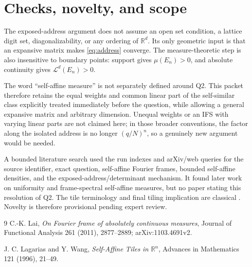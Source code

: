 \documentclass[11pt]{article}
\newcommand{\R}{\mathbb R}
\newcommand{\Leb}{\mathcal L^d}
\begin{document}
\section*{Checks, novelty, and scope}

The exposed-address argument does not assume an open set condition, a lattice
digit set, diagonalizability, or any ordering of $\R^d$.  Its only geometric
input is that an expansive matrix makes \eqref{eq:address} converge.  The
measure-theoretic step is also insensitive to boundary points: support gives
$\mu(E_n)>0$, and absolute continuity gives $\Leb(E_n)>0$.

The word ``self-affine measure'' is not separately defined around Q2.  This
packet therefore retains the equal weights and common linear part of the
self-similar class explicitly treated immediately before the question, while
allowing a general expansive matrix and arbitrary dimension.  Unequal
weights or an IFS with varying linear parts are not claimed here; in those
broader conventions, the factor along the isolated address is no longer
$(q/N)^n$, so a genuinely new argument would be needed.

A bounded literature search used the run indexes and arXiv/web queries for
the source identifier, exact question, self-affine Fourier frames, bounded
self-affine densities, and the exposed-address/determinant mechanism.  It
found later work on uniformity and frame-spectral self-affine measures, but
no paper stating this resolution of Q2.  The tile terminology and final
tiling implication are classical \cite{LW}.  Novelty is therefore
provisional pending expert review.

\begin{thebibliography}{9}
C.-K. Lai,
\emph{On Fourier frame of absolutely continuous measures},
Journal of Functional Analysis 261 (2011), 2877--2889;
arXiv:1103.4691v2.

J. C. Lagarias and Y. Wang,
\emph{Self-Affine Tiles in $\R^n$},
Advances in Mathematics 121 (1996), 21--49.
\end{thebibliography}
\end{document}
